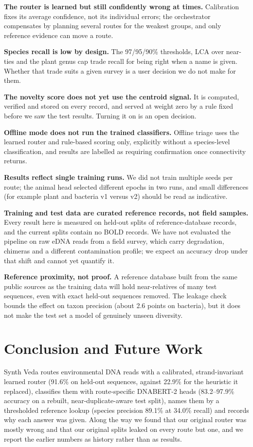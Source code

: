 \documentclass[conference]{IEEEtran}
\begin{document}
\textbf{The router is learned but still confidently wrong at times.} Calibration fixes its average confidence, not its individual errors; the orchestrator compensates by planning several routes for the weakest groups, and only reference evidence can move a route.

\textbf{Species recall is low by design.} The 97/95/90\% thresholds, LCA over near-ties and the plant genus cap trade recall for being right when a name is given. Whether that trade suits a given survey is a user decision we do not make for them.

\textbf{The novelty score does not yet use the centroid signal.} It is computed, verified and stored on every record, and served at weight zero by a rule fixed before we saw the test results. Turning it on is an open decision.

\textbf{Offline mode does not run the trained classifiers.} Offline triage uses the learned router and rule-based scoring only, explicitly without a species-level classification, and results are labelled as requiring confirmation once connectivity returns.

\textbf{Results reflect single training runs.} We did not train multiple seeds per route; the animal head selected different epochs in two runs, and small differences (for example plant and bacteria v1 versus v2) should be read as indicative.

\textbf{Training and test data are curated reference records, not field samples.} Every result here is measured on held-out splits of reference-database records, and the current splits contain no BOLD records. We have not evaluated the pipeline on raw eDNA reads from a field survey, which carry degradation, chimeras and a different contamination profile; we expect an accuracy drop under that shift and cannot yet quantify it.

\textbf{Reference proximity, not proof.} A reference database built from the same public sources as the training data will hold near-relatives of many test sequences, even with exact held-out sequences removed. The leakage check bounds the effect on taxon precision (about 2.6 points on bacteria), but it does not make the test set a model of genuinely unseen diversity.

\section{Conclusion and Future Work}

Synth Veda routes environmental DNA reads with a calibrated, strand-invariant learned router (91.6\% on held-out sequences, against 22.9\% for the heuristic it replaced), classifies them with route-specific DNABERT-2 heads (83.2--97.9\% accuracy on a rebuilt, near-duplicate-aware test split), names them by a thresholded reference lookup (species precision 89.1\% at 34.0\% recall) and records why each answer was given. Along the way we found that our original router was mostly wrong and that our original splits leaked on every route but one, and we report the earlier numbers as history rather than as results.
\end{document}
